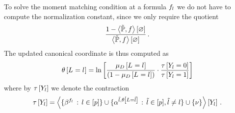 To solve the moment matching condition at a formula $f_{l}$ we do not have to compute the normalization constant, since we only require the quotient
\begin{align*}
    \frac{1-\left\langle \tilde{\mathbb{P}},f\right\rangle \left[ \varnothing \right]}{\left\langle \tilde{\mathbb{P}},f\right\rangle \left[ \varnothing \right]} \, .
\end{align*}
The updated canonical coordinate is thus computed as
\begin{align}
    \label{sol:momentMatchingExformula}
    \theta\left[L_{}=l_{}\right] = \ln \left[ 
        \frac{\mu_{D}\left[L_{}=l_{}\right]}{(1-\mu_{D}\left[L_{}=l_{}\right])}
        \cdot \frac{\tau\left[Y_{l}=0\right]}{\tau\left[Y_{l}=1\right]}
     \right]
\end{align}
where by $\tau\left[Y_{l}\right]$ we denote the contraction
\begin{align*}
    \tau\left[Y_{l}\right]
    = \left\langle \{\beta^{f_{l}} \,:\, l\in[p]\}
    \cup\{\alpha^{\tilde{l},\theta\left[L=\tilde{l}\right]} \,:\, \tilde{l} \in [p], \tilde{l}\neq l\}
    \cup\{\nu\}\right\rangle \left[ Y_{l} \right] \, .
\end{align*}

